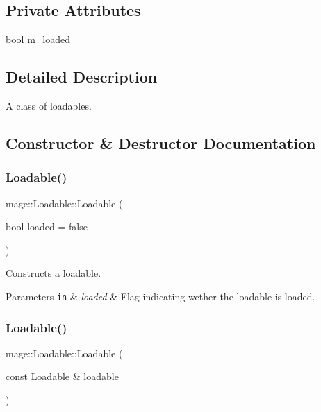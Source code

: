 \subsection*{Private Attributes}
\begin{DoxyCompactItemize}
\item 
bool \hyperlink{classmage_1_1_loadable_a993963fbfeb0f2e2ab9616bf7ef6a0f7}{m\+\_\+loaded}
\end{DoxyCompactItemize}


\subsection{Detailed Description}
A class of loadables. 

\subsection{Constructor \& Destructor Documentation}
\hypertarget{classmage_1_1_loadable_afbdcb287b5e20583899a27a1c244bc7d}{}\label{classmage_1_1_loadable_afbdcb287b5e20583899a27a1c244bc7d} 
\subsubsection{\texorpdfstring{Loadable()}{Loadable()}\hspace{0.1cm}{\footnotesize\ttfamily [1/2]}}
{\footnotesize\ttfamily mage\+::\+Loadable\+::\+Loadable (\begin{DoxyParamCaption}\item[{bool}]{loaded = {\ttfamily false} }\end{DoxyParamCaption})\hspace{0.3cm}{\ttfamily [protected]}}

Constructs a loadable.


\begin{DoxyParams}[1]{Parameters}
\mbox{\tt in}  & {\em loaded} & Flag indicating wether the loadable is loaded. \\
\hline
\end{DoxyParams}
\hypertarget{classmage_1_1_loadable_aaea04657cc6f150659f0ab387f6a5514}{}\label{classmage_1_1_loadable_aaea04657cc6f150659f0ab387f6a5514} 
\subsubsection{\texorpdfstring{Loadable()}{Loadable()}\hspace{0.1cm}{\footnotesize\ttfamily [2/2]}}
{\footnotesize\ttfamily mage\+::\+Loadable\+::\+Loadable (\begin{DoxyParamCaption}\item[{const \hyperlink{classmage_1_1_loadable}{Loadable} \&}]{loadable }\end{DoxyParamCaption})\hspace{0.3cm}{\ttfamily [protected]}}

